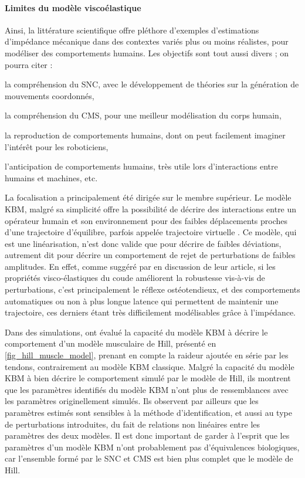 \paragraph{Limites du modèle viscoélastique}

Ainsi, la littérature scientifique offre pléthore d'exemples d'estimations d'impédance mécanique dans des contextes variés plus ou moins réalistes, pour modéliser des comportements humains. Les objectifs sont tout aussi divers ; on pourra citer : 
\begin{enumerate*}[label=\roman*)]
	\item la compréhension du SNC, avec le développement de théories sur la génération de mouvements coordonnés, 
	\item la compréhension du CMS, pour une meilleur modélisation du corps humain,
	\item la reproduction de comportements humains, dont on peut facilement imaginer l'intérêt pour les roboticiens,
	\item l'anticipation de comportements humains, très utile lors d'interactions entre humains et machines, etc.
\end{enumerate*}	
La focalisation a principalement été dirigée sur le membre supérieur. Le modèle KBM, malgré sa simplicité offre la possibilité de décrire des interactions entre un opérateur humain et son environnement pour des faibles déplacements proches d'une trajectoire d'équilibre, parfois appelée trajectoire virtuelle \parencite{tsuji_human_1997}. Ce modèle, qui est une linéarisation, n'est donc valide que pour décrire de faibles déviations, autrement dit pour décrire un comportement de rejet de perturbations de faibles amplitudes. En effet, comme suggéré par \textcite{popescu_elbow_2003} en discussion de leur article, si les propriétés visco-élastiques du coude améliorent la robustesse vis-à-vis de perturbations, c'est principalement le réflexe ostéotendieux, et des comportements automatiques ou non à plus longue latence qui permettent de maintenir une trajectoire, ces derniers étant très difficilement modélisables grâce à l'impédance.

Dans des simulations, \textcite{kistemaker_vivo_2011} ont évalué la capacité du modèle KBM à décrire le comportement d'un modèle musculaire de Hill, présenté en \cref{fig_hill_muscle_model}, prenant en compte la raideur ajoutée en série par les tendons, contrairement au modèle KBM classique. Malgré la capacité du modèle KBM à bien décrire le comportement simulé par le modèle de Hill, ils montrent que les paramètres identifiés du modèle KBM n'ont plus de ressemblances avec les paramètres originellement simulés. Ils observent par ailleurs que les paramètres estimés sont sensibles à la méthode d'identification, et aussi au type de perturbations introduites, du fait de relations non linéaires entre les paramètres des deux modèles. Il est donc important de garder à l'esprit que les paramètres d'un modèle KBM n'ont probablement pas d'équivalences biologiques, car l'ensemble formé par le SNC et CMS est bien plus complet que le modèle de Hill. 

